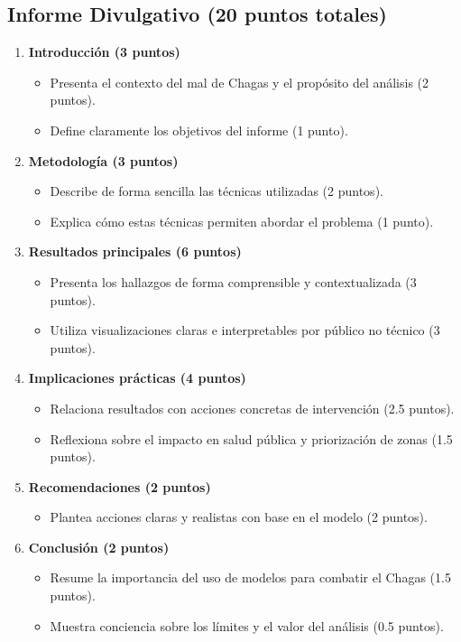 \documentclass[a4,11pt]{aleph-notas}
\begin{document}
\subsection*{Informe Divulgativo (20 puntos totales)}
\begin{enumerate}[leftmargin=*, label=\textbf{\arabic*.}]
    \item \textbf{Introducción (3 puntos)}
    \begin{itemize}[leftmargin=*]
        \item Presenta el contexto del mal de Chagas y el propósito del análisis (2 puntos).
        \item Define claramente los objetivos del informe (1 punto).
    \end{itemize}

    \item \textbf{Metodología (3 puntos)}
    \begin{itemize}[leftmargin=*]
        \item Describe de forma sencilla las técnicas utilizadas (2 puntos).
        \item Explica cómo estas técnicas permiten abordar el problema (1 punto).
    \end{itemize}

    \item \textbf{Resultados principales (6 puntos)}
    \begin{itemize}[leftmargin=*]
        \item Presenta los hallazgos de forma comprensible y contextualizada (3 puntos).
        \item Utiliza visualizaciones claras e interpretables por público no técnico (3 puntos).
    \end{itemize}

    \item \textbf{Implicaciones prácticas (4 puntos)}
    \begin{itemize}[leftmargin=*]
        \item Relaciona resultados con acciones concretas de intervención (2.5 puntos).
        \item Reflexiona sobre el impacto en salud pública y priorización de zonas (1.5 puntos).
    \end{itemize}

    \item \textbf{Recomendaciones (2 puntos)}
    \begin{itemize}[leftmargin=*]
        \item Plantea acciones claras y realistas con base en el modelo (2 puntos).
    \end{itemize}

    \item \textbf{Conclusión (2 puntos)}
    \begin{itemize}[leftmargin=*]
        \item Resume la importancia del uso de modelos para combatir el Chagas (1.5 puntos).
        \item Muestra conciencia sobre los límites y el valor del análisis (0.5 puntos).
    \end{itemize}
\end{enumerate}
\end{document}
